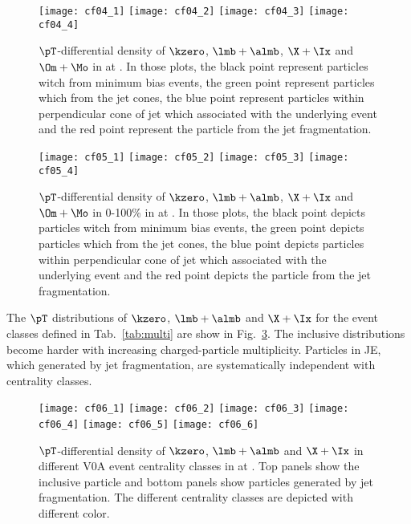 \begin{figure}[!ht]
	\begin{center}
		\texttt{[image: cf04\_1]}
		\texttt{[image: cf04\_2]}
		\texttt{[image: cf04\_3]}
		\texttt{[image: cf04\_4]}
	\end{center}
	\caption{$\pT$-differential density of $\kzero$, $\lmb + \almb$, $\X + \Ix$ and $\Om + \Mo$ in \pp at \thirteen. In those plots, the black point represent particles witch from minimum bias events, the green point represent particles which from the jet cones, the blue point represent particles within perpendicular cone of jet which associated with the underlying event and the red point represent the particle from the jet fragmentation.}
	\label{fig:ppSpect}
\end{figure}
\begin{figure}[!ht]
	\begin{center}
		\texttt{[image: cf05\_1]}
		\texttt{[image: cf05\_2]}
		\texttt{[image: cf05\_3]}
		\texttt{[image: cf05\_4]}
	\end{center}
	\caption{$\pT$-differential density of $\kzero$, $\lmb + \almb$, $\X + \Ix$ and $\Om + \Mo$ in 0-100\% in \pPb at \fivenn. In those plots, the black point depicts particles witch from minimum bias events, the green point depicts particles which from the jet cones, the blue point depicts particles within perpendicular cone of jet which associated with the underlying event and the red point depicts the particle from the jet fragmentation.}
	\label{fig:pPbSpect}
\end{figure}

The $\pT$ distributions of $\kzero$, $\lmb + \almb$ and $\X + \Ix$ for the event classes defined in Tab.~\ref{tab:multi} are show in Fig.~\ref{fig:pPbSpectwCent}. The inclusive distributions become harder with increasing charged-particle multiplicity. Particles in JE, which generated by jet fragmentation, are systematically independent with centrality classes.
\begin{figure}[!ht]
\begin{center}
	\texttt{[image: cf06\_1]}
	\texttt{[image: cf06\_2]}
	\texttt{[image: cf06\_3]}
	\texttt{[image: cf06\_4]}
	\texttt{[image: cf06\_5]}
	\texttt{[image: cf06\_6]}
\end{center}
\caption{$\pT$-differential density of $\kzero$, $\lmb + \almb$ and $\X + \Ix$ in different V0A event centrality classes in \pPb at \fivenn. Top panels show the inclusive particle and bottom panels show particles generated by jet fragmentation. The different centrality classes are depicted with different color.}
\label{fig:pPbSpectwCent}
\end{figure}

